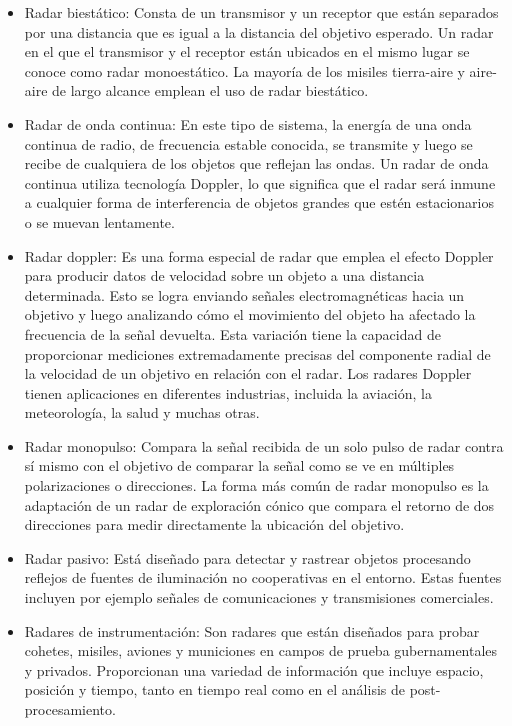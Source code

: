 \begin{itemize}
\item Radar biestático:
Consta de un transmisor y un receptor que están separados por una distancia que es igual a la distancia del objetivo esperado. Un radar en el que el transmisor y el receptor están ubicados en el mismo lugar se conoce como radar monoestático. La mayoría de los misiles tierra-aire y aire-aire de largo alcance emplean el uso de radar biestático.

\item Radar de onda continua:
En este tipo de sistema, la energía de una onda continua de radio, de frecuencia estable conocida, se transmite y luego se recibe de cualquiera de los objetos que reflejan las ondas. Un radar de onda continua utiliza tecnología Doppler, lo que significa que el radar será inmune a cualquier forma de interferencia de objetos grandes que estén estacionarios o se muevan lentamente.

\item Radar doppler:
Es una forma especial de radar que emplea el efecto Doppler para producir datos de velocidad sobre un objeto a una distancia determinada. Esto se logra enviando señales electromagnéticas hacia un objetivo y luego analizando cómo el movimiento del objeto ha afectado la frecuencia de la señal devuelta. Esta variación tiene la capacidad de proporcionar mediciones extremadamente precisas del componente radial de la velocidad de un objetivo en relación con el radar. Los radares Doppler tienen aplicaciones en diferentes industrias, incluida la aviación, la meteorología, la salud y muchas otras.

\item Radar monopulso:
Compara la señal recibida de un solo pulso de radar contra sí mismo con el objetivo de comparar la señal como se ve en múltiples polarizaciones o direcciones. La forma más común de radar monopulso es la adaptación de un radar de exploración cónico que compara el retorno de dos direcciones para medir directamente la ubicación del objetivo.

\item Radar pasivo:
Está diseñado para detectar y rastrear objetos procesando reflejos de fuentes de iluminación no cooperativas en el entorno. Estas fuentes incluyen por ejemplo señales de comunicaciones y transmisiones comerciales.

\item Radares de instrumentación:
Son radares que están diseñados para probar cohetes, misiles, aviones y municiones en campos de prueba gubernamentales y privados. Proporcionan una variedad de información que incluye espacio, posición y tiempo, tanto en tiempo real como en el análisis de post-procesamiento.


\end{itemize}
